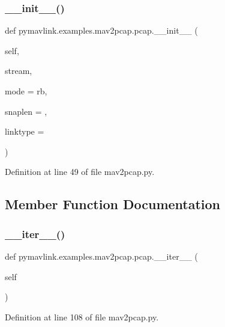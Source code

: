 \subsubsection{\texorpdfstring{\_\_init\_\_()}{\_\_init\_\_()}}
{\footnotesize\ttfamily def pymavlink.\+examples.\+mav2pcap.\+pcap.\+\_\+\+\_\+init\+\_\+\+\_\+ (\begin{DoxyParamCaption}\item[{}]{self,  }\item[{}]{stream,  }\item[{}]{mode = {\ttfamily \textquotesingle{}rb\textquotesingle{}},  }\item[{}]{snaplen = {},  }\item[{}]{linktype = {} }\end{DoxyParamCaption})}



Definition at line 49 of file mav2pcap.\+py.



\subsection{Member Function Documentation}
\mbox{\label{classpymavlink_1_1examples_1_1mav2pcap_1_1pcap_a409fec0dbf2e76e737d5e0b28ffa3f77}} 
\subsubsection{\texorpdfstring{\_\_iter\_\_()}{\_\_iter\_\_()}}
{\footnotesize\ttfamily def pymavlink.\+examples.\+mav2pcap.\+pcap.\+\_\+\+\_\+iter\+\_\+\+\_\+ (\begin{DoxyParamCaption}\item[{}]{self }\end{DoxyParamCaption})}



Definition at line 108 of file mav2pcap.\+py.

\mbox{\label{classpymavlink_1_1examples_1_1mav2pcap_1_1pcap_a115443af4c2e19f902a584b67e021ae8}} 
